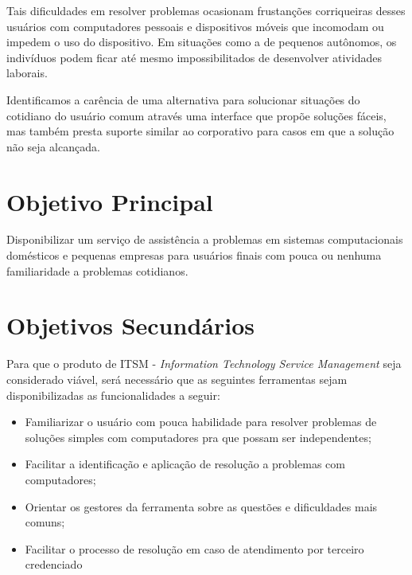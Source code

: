 		Tais dificuldades em resolver problemas ocasionam frustanções corriqueiras desses usuários com computadores pessoais e dispositivos móveis que incomodam ou impedem o uso do dispositivo. Em situações como a de pequenos autônomos, os indivíduos podem ficar até mesmo impossibilitados de desenvolver atividades laborais.

		Identificamos a carência de uma alternativa para solucionar situações do cotidiano do usuário comum através uma interface que propõe soluções fáceis, mas também presta suporte similar ao corporativo para casos em que a solução não seja alcançada.
	
	\section[Objetivo Principal]{Objetivo Principal}
	
		Disponibilizar um serviço de assistência a problemas em sistemas computacionais domésticos e pequenas empresas para usuários finais com pouca ou nenhuma familiaridade a problemas cotidianos.
	
	\section[Objetivos Secundários]{Objetivos Secundários}
	
		Para que o produto de ITSM - \textit{Information Technology Service Management} seja considerado viável, será necessário que as seguintes ferramentas sejam disponibilizadas as funcionalidades a seguir: 
	
		\begin{itemize}
			
			\item
			Familiarizar o usuário com pouca habilidade para resolver problemas de soluções simples com computadores pra que possam ser independentes;
			
			\item
			Facilitar a identificação e aplicação de resolução a problemas com computadores;
			
			\item
			Orientar os gestores da ferramenta sobre as questões e dificuldades mais comuns;
			
			\item 
			Facilitar o processo de resolução em caso de atendimento por terceiro credenciado
			
		\end{itemize}
	
